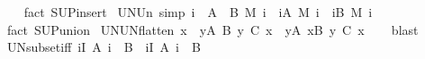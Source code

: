 \begin{isabellebody}
%
\isadelimproof
\ \ %
\endisadelimproof
%
\isatagproof
{}\isamarkupfalse%
\ {\isacharparenleft}{\kern0pt}fact\ SUP{\isacharunderscore}{\kern0pt}insert{\isacharparenright}{\kern0pt}%
\endisatagproof
{\isafoldproof}%
%
\isadelimproof
\isanewline
%
\endisadelimproof
\isanewline
{}\isamarkupfalse%
\ UN{\isacharunderscore}{\kern0pt}Un\ {\isacharbrackleft}{\kern0pt}simp{\isacharbrackright}{\kern0pt}{\isacharcolon}{\kern0pt}\ {\isachardoublequoteopen}{\isacharparenleft}{\kern0pt}{\isasymUnion}i\ {\isasymin}\ A\ {\isasymunion}\ B{\isachardot}{\kern0pt}\ M\ i{\isacharparenright}{\kern0pt}\ {\isacharequal}{\kern0pt}\ {\isacharparenleft}{\kern0pt}{\isasymUnion}i{\isasymin}A{\isachardot}{\kern0pt}\ M\ i{\isacharparenright}{\kern0pt}\ {\isasymunion}\ {\isacharparenleft}{\kern0pt}{\isasymUnion}i{\isasymin}B{\isachardot}{\kern0pt}\ M\ i{\isacharparenright}{\kern0pt}{\isachardoublequoteclose}\isanewline
%
\isadelimproof
\ \ %
\endisadelimproof
%
\isatagproof
{}\isamarkupfalse%
\ {\isacharparenleft}{\kern0pt}fact\ SUP{\isacharunderscore}{\kern0pt}union{\isacharparenright}{\kern0pt}%
\endisatagproof
{\isafoldproof}%
%
\isadelimproof
\isanewline
%
\endisadelimproof
\isanewline
{}\isamarkupfalse%
\ UN{\isacharunderscore}{\kern0pt}UN{\isacharunderscore}{\kern0pt}flatten{\isacharcolon}{\kern0pt}\ {\isachardoublequoteopen}{\isacharparenleft}{\kern0pt}{\isasymUnion}x\ {\isasymin}\ {\isacharparenleft}{\kern0pt}{\isasymUnion}y{\isasymin}A{\isachardot}{\kern0pt}\ B\ y{\isacharparenright}{\kern0pt}{\isachardot}{\kern0pt}\ C\ x{\isacharparenright}{\kern0pt}\ {\isacharequal}{\kern0pt}\ {\isacharparenleft}{\kern0pt}{\isasymUnion}y{\isasymin}A{\isachardot}{\kern0pt}\ {\isasymUnion}x{\isasymin}B\ y{\isachardot}{\kern0pt}\ C\ x{\isacharparenright}{\kern0pt}{\isachardoublequoteclose}\isanewline
%
\isadelimproof
\ \ %
\endisadelimproof
%
\isatagproof
{}\isamarkupfalse%
\ blast%
\endisatagproof
{\isafoldproof}%
%
\isadelimproof
\isanewline
%
\endisadelimproof
\isanewline
{}\isamarkupfalse%
\ UN{\isacharunderscore}{\kern0pt}subset{\isacharunderscore}{\kern0pt}iff{\isacharcolon}{\kern0pt}\ {\isachardoublequoteopen}{\isacharparenleft}{\kern0pt}{\isacharparenleft}{\kern0pt}{\isasymUnion}i{\isasymin}I{\isachardot}{\kern0pt}\ A\ i{\isacharparenright}{\kern0pt}\ {\isasymsubseteq}\ B{\isacharparenright}{\kern0pt}\ {\isacharequal}{\kern0pt}\ {\isacharparenleft}{\kern0pt}{\isasymforall}i{\isasymin}I{\isachardot}{\kern0pt}\ A\ i\ {\isasymsubseteq}\ B{\isacharparenright}{\kern0pt}{\isachardoublequoteclose}\isanewline

\end{isabellebody}
